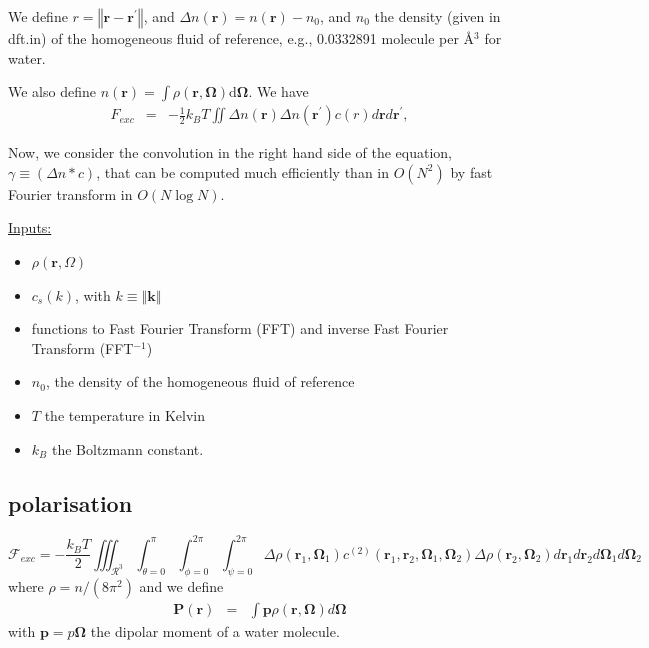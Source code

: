 We define $r=\left\Vert \bm{r}-\bm{r}^{\prime}\right\Vert $, and
$\Delta n\left(\bm{r}\right)=n\left(\bm{r}\right)-n_{0}$, and $n_{0}$
the density (given in dft.in) of the homogeneous fluid of reference,
e.g., 0.0332891 molecule per \AA$^3$ for water.

We also define $n\left(\bm{r}\right)=\int\rho(\bm{r},\boldsymbol{\Omega})\mbox{d}\boldsymbol{\Omega}$.
We have 
\begin{eqnarray}
F_{exc} & = & -\frac{1}{2}k_{B}T\iint\Delta n\left(\boldsymbol{r}\right)\Delta n\left(\boldsymbol{r}^{\prime}\right)c\left(r\right)d\bm{r}d\bm{r}^{\prime},
\end{eqnarray}


Now, we consider the convolution in the right hand side of the equation,
$\gamma\equiv\left(\Delta n*c\right)$, that can be computed much
efficiently than in $O\left(N^{2}\right)$ by fast Fourier transform
in $O\left(N\log N\right)$.

\uline{Inputs:}
\begin{itemize}
\item $\rho\left(\bm{r},\Omega\right)$
\item $c_{s}\left(k\right)$, with $k\equiv\left\Vert \bm{k}\right\Vert $
\item functions to Fast Fourier Transform (FFT) and inverse Fast Fourier
Transform (FFT$^{-1}$)
\item $n_{0}$, the density of the homogeneous fluid of reference
\item $T$ the temperature in Kelvin
\item $k_{B}$ the Boltzmann constant.
\end{itemize}

\subsection{polarisation}

\begin{equation}
\mathcal{F}_{exc}=-\frac{k_{B}T}{2}\iiint_{\mathcal{R}^{3}}\int_{\theta=0}^{\pi}\int_{\phi=0}^{2\pi}\int_{\psi=0}^{2\pi}\Delta\rho\left(\bm{r}_{1},\bm{\Omega}_{1}\right)c^{\left(2\right)}\left(\bm{r}_{1},\bm{r}_{2},\bm{\Omega}_{1},\bm{\Omega}_{2}\right)\Delta\rho\left(\bm{r}_{2},\bm{\Omega}_{2}\right)d\bm{r}_{1}d\bm{r}_{2}d\bm{\Omega}_{1}d\bm{\Omega}_{2}
\end{equation}
where $\rho=n/\left(8\pi^{2}\right)$ and we define 
\begin{eqnarray}
\bm{P}\left(\bm{r}\right) & = & \int\bm{p}\rho\left(\bm{r},\bm{\Omega}\right)d\bm{\Omega}
\end{eqnarray}
with $\bm{p}=p\bm{\Omega}$ the dipolar moment of a water molecule.


